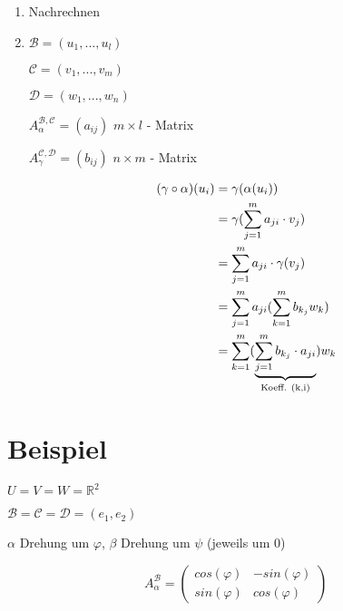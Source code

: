\documentclass[a4paper, openany]{book}
\begin{document}
        \begin{enumerate}[label=(\alph*)]
          \item Nachrechnen
          \item $\mathcal{B} = (u_1, ..., u_l)$

          $\mathcal{C} = (v_1, ..., v_m)$

          $\mathcal{D} = (w_1, ..., w_n)$

          \par \medskip

          \begin{center}
            $A_{\alpha}^{\mathcal{B,C}} = (a_{ij})$ $m \times l$ - Matrix 

            $A_{\gamma}^{\mathcal{C,D}} = (b_{ij})$ $n \times m$ - Matrix
          \end{center}

          \begin{align*}
            (\gamma \circ \alpha) (u_i) & = \gamma(\alpha(u_i)) \\
                                        & = \gamma(\sum_{j=1}^m a_{ji} \cdot v_j) \\
                                        & = \sum_{j=1}^m a_{ji} \cdot \gamma(v_j) \\
                                        & = \sum_{j=1}^m a_{ji} (\sum_{k=1}^m b_{k_j} w_k) \\
                                        & = \sum_{k=1}^m (\underbrace{\sum_{j=1}^m b_{k_j} \cdot a_{ji}}_{\textnormal{Koeff. (k,i)}}) w_k
          \end{align*}
        \end{enumerate}

        \section{Beispiel}

        $U = V = W = \mathbb{R}^2$

        $\mathcal{B = C = D} = (e_1, e_2)$

        \par \medskip

        $\alpha$ Drehung um $\varphi$, $\beta$ Drehung um $\psi$ (jeweils um 0)

        \begin{equation}
          A_{\alpha}^{\mathcal{B}} = \begin{pmatrix}cos(\varphi) & - sin(\varphi) \\ sin(\varphi) & cos(\varphi)\end{pmatrix}
        \end{equation}
\end{document}
